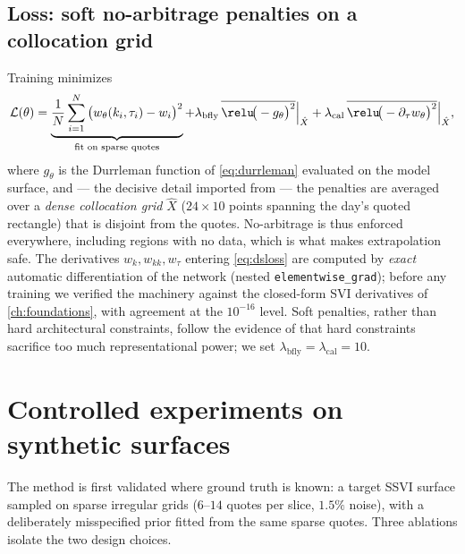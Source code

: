 \subsection{Loss: soft no-arbitrage penalties on a collocation grid}
Training minimizes
\begin{equation}
  \mathcal L(\theta)
  = \underbrace{\frac1N\sum_{i=1}^{N}\big(w_\theta(k_i,\tau_i)-w_i\big)^2}_{\text{fit on sparse quotes}}
  + \lambda_{\mathrm{bfly}}\,\overline{\relu\!\big(-g_\theta\big)^2}\Big|_{\hat X}
  + \lambda_{\mathrm{cal}}\,\overline{\relu\!\big(-\partial_\tau w_\theta\big)^2}\Big|_{\hat X},
  \label{eq:dsloss}
\end{equation}
where $g_\theta$ is the Durrleman function of \cref{eq:durrleman} evaluated
on the model surface, and --- the decisive detail imported from
\cite{hoshisashi2024noarbitrage} --- the penalties are averaged over a
\emph{dense collocation grid} $\hat X$ ($24\times10$ points spanning the
day's quoted rectangle) that is disjoint from the quotes. No-arbitrage is
thus enforced everywhere, including regions with no data, which is what makes
extrapolation safe. The derivatives $w_k,w_{kk},w_\tau$ entering
\cref{eq:dsloss} are computed by \emph{exact} automatic differentiation of
the network (nested \texttt{elementwise\_grad}); before any training we
verified the machinery against the closed-form SVI derivatives of
\cref{ch:foundations}, with agreement at the $10^{-16}$ level. Soft
penalties, rather than hard architectural constraints, follow the evidence of
\cite{chataigner2020deep} that hard constraints sacrifice too much
representational power; we set $\lambda_{\mathrm{bfly}}=\lambda_{\mathrm{cal}}=10$.

\section{Controlled experiments on synthetic surfaces}
\label{sec:dsablation}

The method is first validated where ground truth is known: a target SSVI
surface sampled on sparse irregular grids ($6$--$14$ quotes per slice, $1.5\%$
noise), with a deliberately misspecified prior fitted from the same sparse
quotes. Three ablations isolate the two design choices.


